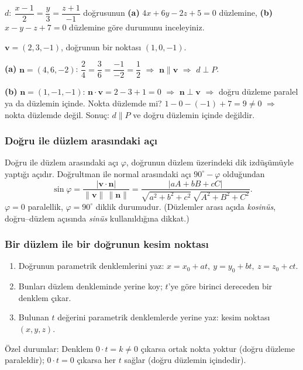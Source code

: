 \begin{soru}
$d:\ \dfrac{x-1}{2}=\dfrac{y}{3}=\dfrac{z+1}{-1}$ doğrusunun
\textbf{(a)} $4x+6y-2z+5=0$ düzlemine,
\textbf{(b)} $x-y-z+7=0$ düzlemine göre durumunu inceleyiniz.
\end{soru}
\begin{cevap}
$\mathbf v=(2,3,-1)$, doğrunun bir noktası $(1,0,-1)$.

\textbf{(a)} $\mathbf n=(4,6,-2)$: $\dfrac24=\dfrac36=\dfrac{-1}{-2}=\dfrac12$ $\Rightarrow$ $\mathbf n\parallel\mathbf v$ $\Rightarrow$ $\boxed{d\perp P}$.

\textbf{(b)} $\mathbf n=(1,-1,-1)$: $\mathbf n\cdot\mathbf v=2-3+1=0$ $\Rightarrow$ $\mathbf n\perp\mathbf v$ $\Rightarrow$ doğru düzleme paralel ya da düzlemin içinde. Nokta düzlemde mi? $1-0-(-1)+7=9\neq0$ $\Rightarrow$ nokta düzlemde değil. Sonuç: $\boxed{d\parallel P}$ ve doğru düzlemin içinde değildir.
\end{cevap}

\subsubsection{Doğru ile düzlem arasındaki açı}

\begin{bilgi}
Doğru ile düzlem arasındaki açı $\varphi$, doğrunun düzlem üzerindeki dik izdüşümüyle yaptığı açıdır. Doğrultman ile normal arasındaki açı $90^\circ-\varphi$ olduğundan
\[ \sin\varphi=\frac{|\mathbf v\cdot\mathbf n|}{\|\mathbf v\|\,\|\mathbf n\|}=\frac{|aA+bB+cC|}{\sqrt{a^2+b^2+c^2}\,\sqrt{A^2+B^2+C^2}} . \]
$\varphi=0$ paralellik, $\varphi=90^\circ$ diklik durumudur. (Düzlemler arası açıda \emph{kosinüs}, doğru--düzlem açısında \emph{sinüs} kullanıldığına dikkat.)
\end{bilgi}

\subsubsection{Bir düzlem ile bir doğrunun kesim noktası}

\begin{teorem}
\begin{enumerate}
  \item Doğrunun parametrik denklemlerini yaz: $x=x_0+at,\ y=y_0+bt,\ z=z_0+ct$.
  \item Bunları düzlem denkleminde yerine koy; $t$'ye göre birinci dereceden bir denklem çıkar.
  \item Bulunan $t$ değerini parametrik denklemlerde yerine yaz: kesim noktası $(x,y,z)$.
\end{enumerate}
Özel durumlar: Denklem $0\cdot t=k\neq0$ çıkarsa ortak nokta yoktur (doğru düzleme paraleldir); $0\cdot t=0$ çıkarsa her $t$ sağlar (doğru düzlemin içindedir).
\end{teorem}

